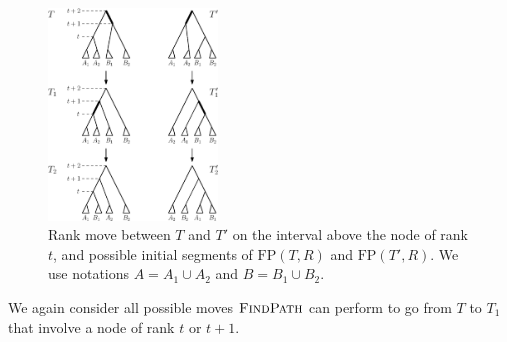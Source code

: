 \documentclass[11pt]{amsart}
\newcommand{\findpath}{\textsc{FindPath}}
\newcommand{\fp}{\mathrm{FP}}
\begin{document}
\begin{figure}[ht]
\centering
\includegraphics[width=0.4\textwidth]{thm_fp_rank1}
\caption{Rank move between $T$ and $T'$ on the interval above the node of rank $t$, and possible initial segments of $\fp(T, R)$ and $\fp(T', R)$.
We use notations ${A = A_1 \cup A_2}$ and $B = B_1 \cup B_2$.}
\label{fig:thm_fp_rank1}
\end{figure}

We again consider all possible moves $\findpath$ can perform to go from $T$ to $T_1$ that involve a node of rank $t$ or $t+1$.
\end{document}
